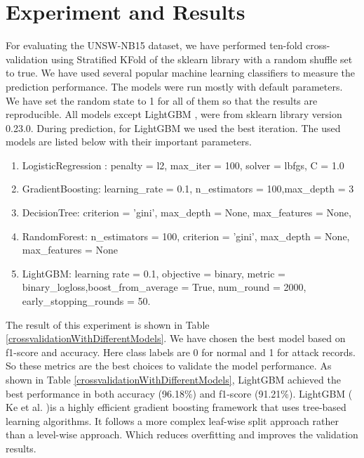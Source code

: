 \documentclass[14pt, conference]{IEEEtran}
\begin{document}
\section{Experiment and Results \label{results}}
For evaluating the UNSW-NB15 dataset, we have performed ten-fold cross-validation using Stratified KFold of the sklearn library with a random shuffle set to true. We have used several popular machine learning classifiers to measure the prediction performance. The models were run mostly with default parameters. We have set the random state to 1 for all of them so that the results are reproducible. All models except LightGBM \cite{ke2017lightgbm}, were from sklearn library version 0.23.0. During prediction, for LightGBM we used the best iteration. The used models are listed below with their important parameters.
\begin{enumerate}
    \item LogisticRegression : penalty = l2, max\_iter = 100, solver = lbfgs, C = 1.0
    \item GradientBoosting: learning\_rate = 0.1, n\_estimators = 100,max\_depth = 3
    \item DecisionTree: criterion = 'gini', max\_depth = None, max\_features = None,
    \item RandomForest: n\_estimators = 100, criterion = 'gini', max\_depth = None, max\_features = None
    \item LightGBM: learning rate = 0.1, objective = binary, metric = binary\_logloss,boost\_from\_average = True,
    num\_round = 2000, early\_stopping\_rounds = 50.
\end{enumerate}

The result of this experiment is shown in Table \ref{crossvalidationWithDifferentModels}. We have chosen the best model based on f1-score and accuracy. Here class labels are 0 for normal and 1 for attack records. So these metrics are the best choices to validate the model performance. As shown in Table \ref{crossvalidationWithDifferentModels}, LightGBM achieved the best performance in both accuracy (96.18\%) and f1-score (91.21\%). LightGBM ( Ke et al. \cite{ke2017lightgbm})is a highly efficient gradient boosting framework that uses tree-based learning algorithms. It follows a more complex leaf-wise split approach rather than a level-wise approach. Which reduces overfitting and improves the validation results. 
\end{document}

